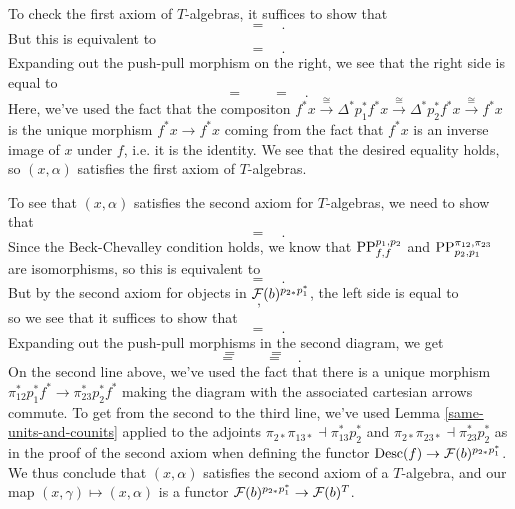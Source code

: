 \documentclass{amsart}
\begin{document}
    To check the first axiom of $T$-algebras, it suffices to show that
    \[
        
        \quad=\quad
        
        .
    \]
    But this is equivalent to
    \[
        
        \quad=\quad
        
        .
    \]
    Expanding out the push-pull morphism on the right, we see that the right side is
        equal to
    \[
        
        \quad=\quad
        
        \quad=\quad
        
        .
    \]
    Here, we've used the fact that the compositon 
        $f^\ast x\xrightarrow{\cong} \Delta^\ast p_1^\ast f^\ast x\xrightarrow{\cong} \Delta^\ast
        p_2^\ast f^\ast x\xrightarrow{\cong} f^\ast x$ is the unique
        morphism $f^\ast x\to f^\ast x$ coming from the fact that $f^\ast x$ is an inverse image of
        $x$ under $f$, i.e. it is the identity.
    We see that the desired equality holds, so $(x,\alpha)$ satisfies the first axiom of
        $T$-algebras.

    To see that $(x,\alpha)$ satisfies the second axiom for $T$-algebras, we need
        to show that
    \[
        
        \quad=\quad
        
        .
    \]
    Since the Beck-Chevalley condition holds, we know that $\operatorname{PP}^{p_1,p_2}_{f,f}$
        and $\operatorname{PP}_{p_2,p_1}^{\pi_{12},\pi_{23}}$ are isomorphisms, so this is equivalent to
    \[
        
        \quad=\quad
        
        .
    \]
    But by the second axiom for objects in $\mathcal F(b)^{p_{2\ast}p_1^\ast}$, the left side is
        equal to
    \[
        
        ,
    \]
        so we see that it suffices to show that
    \[
        
        \quad=\quad
        
        .
    \]
    Expanding out the push-pull morphisms in the second diagram, we get
    \[
        
    \] 
    \[
        =\quad
        
        \quad=\quad
        
    \]
    \[
        =\quad
        
        \quad=\quad
        
        .
    \]
    On the second line above, we've used the fact that there is a unique morphism
        $\pi_{12}^\ast p_1^\ast f^\ast\to \pi_{23}^\ast p_2^\ast f^\ast$
        making the diagram with the associated cartesian arrows commute.
    To get from the second to the third line, we've used Lemma \ref{same-units-and-counits}
        applied to the adjoints $\pi_{2\ast}\pi_{13\ast}\dashv\pi_{13}^\ast p_2^\ast$ 
        and $\pi_{2\ast}\pi_{23\ast}\dashv\pi_{23}^\ast p_2^\ast$ as in the proof of 
        the second axiom when defining the functor $\operatorname{Desc}(f)\to \mathcal F(b)^{p_{2\ast}p_1^\ast}$.
    We thus conclude that $(x,\alpha)$ satisfies the second axiom 
        of a $T$-algebra, and our map $(x,\gamma)\mapsto (x,\alpha)$
        is a functor $\mathcal F(b)^{p_{2\ast}p_1^\ast}\to \mathcal F(b)^T$.
\end{document}
